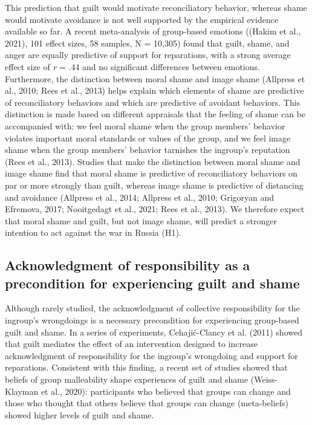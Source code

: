 \documentclass[
]{article}
\begin{document}
This prediction that guilt would motivate reconciliatory behavior, whereas shame would motivate avoidance is not well supported by the empirical evidence available so far. A recent meta-analysis of group-based emotions ((Hakim et al., 2021), 101 effect sizes, 58 samples, N = 10,305) found that guilt, shame, and anger are equally predictive of support for reparations, with a strong average effect size of \emph{r} = .44 and no significant differences between emotions. Furthermore, the distinction between moral shame and image shame (Allpress et al., 2010; Rees et al., 2013) helps explain which elements of shame are predictive of reconciliatory behaviors and which are predictive of avoidant behaviors. This distinction is made based on different appraisals that the feeling of shame can be accompanied with: we feel moral shame when the group members' behavior violates important moral standards or values of the group, and we feel image shame when the group members' behavior tarnishes the ingroup's reputation (Rees et al., 2013). Studies that make the distinction between moral shame and image shame find that moral shame is predictive of reconciliatory behaviors on par or more strongly than guilt, whereas image shame is predictive of distancing and avoidance (Allpress et al., 2014; Allpress et al., 2010; Grigoryan and Efremova, 2017; Nooitgedagt et al., 2021; Rees et al., 2013). We therefore expect that moral shame and guilt, but not image shame, will predict a stronger intention to act against the war in Russia (H1).

\hypertarget{acknowledgment-of-responsibility-as-a-precondition-for-experiencing-guilt-and-shame}{%
\subsection*{Acknowledgment of responsibility as a precondition for experiencing guilt and shame}\label{acknowledgment-of-responsibility-as-a-precondition-for-experiencing-guilt-and-shame}}

Although rarely studied, the acknowledgment of collective responsibility for the ingroup's wrongdoings is a necessary precondition for experiencing group-based guilt and shame. In a series of experiments, Cehajić-Clancy et al. (2011) showed that guilt mediates the effect of an intervention designed to increase acknowledgment of responsibility for the ingroup's wrongdoing and support for reparations. Consistent with this finding, a recent set of studies showed that beliefs of group malleability shape experiences of guilt and shame (Weiss-Klayman et al., 2020): participants who believed that groups can change and those who thought that others believe that groups can change (meta-beliefs) showed higher levels of guilt and shame.
\end{document}

